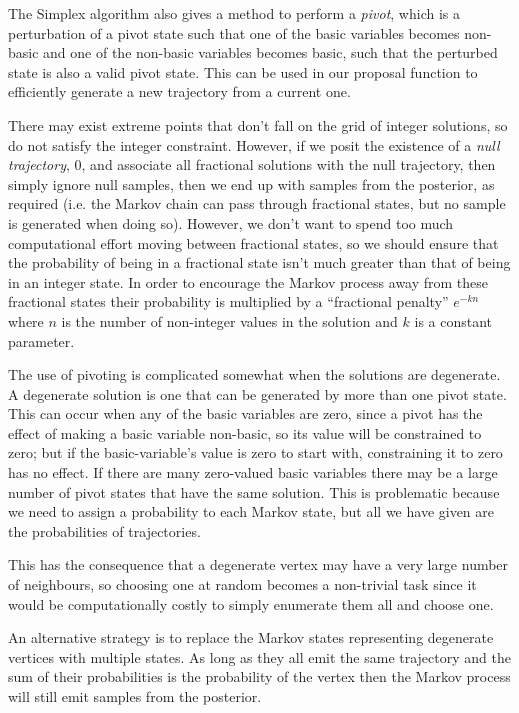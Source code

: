 \documentclass{article}
\begin{document}
The Simplex algorithm also gives a method to perform a \textit{pivot}, which is a perturbation of a pivot state such that one of the basic variables becomes non-basic and one of the non-basic variables becomes basic, such that the perturbed state is also a valid pivot state. This can be used in our proposal function to efficiently generate a new trajectory from a current one.

There may exist extreme points that don't fall on the grid of integer solutions, so do not satisfy the integer constraint. However, if we posit the existence of a \textit{null trajectory}, $0$, and associate all fractional solutions with the null trajectory, then simply ignore null samples, then we end up with samples from the posterior, as required (i.e. the Markov chain can pass through fractional states, but no sample is generated when doing so). However, we don't want to spend too much computational effort moving between fractional states, so we should ensure that the probability of being in a fractional state isn't much greater than that of being in an integer state. In order to encourage the Markov process away from these fractional states their probability is multiplied by a ``fractional penalty'' $e^{-kn}$ where $n$ is the number of non-integer values in the solution and $k$ is a constant parameter. 

The use of pivoting is complicated somewhat when the solutions are degenerate. A degenerate solution is one that can be generated by more than one pivot state. This can occur when any of the basic variables are zero, since a pivot has the effect of making a basic variable non-basic, so its value will be constrained to zero; but if the basic-variable's value is zero to start with, constraining it to zero has no effect. If there are many zero-valued basic variables there may be a large number of pivot states that have the same solution. This is problematic because we need to assign a probability to each Markov state, but all we have given are the probabilities of trajectories.

 This has the consequence that a degenerate vertex may have a very large number of neighbours, so choosing one at random becomes a non-trivial task since it would be computationally costly to simply enumerate them all and choose one\cite{gal1992new}\cite{yamada1994enumerating}.

An alternative strategy is to replace the Markov states representing degenerate vertices with multiple states. As long as they all emit the same trajectory and the sum of their probabilities is the probability of the vertex then the Markov process will still emit samples from the posterior.
\end{document}
